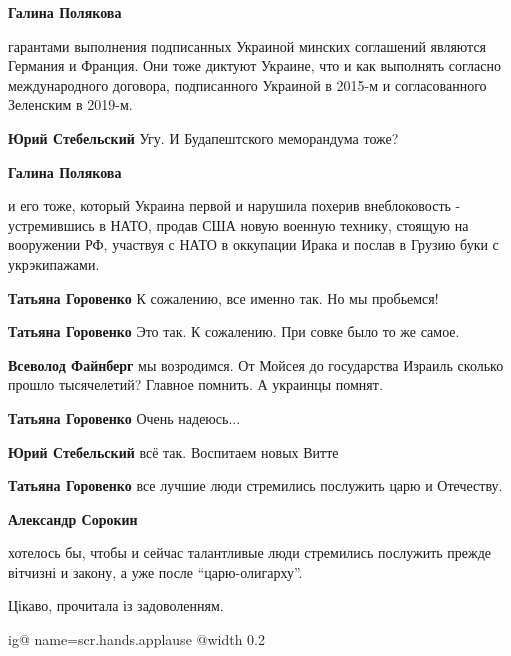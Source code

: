 \begin{itemize}
\begin{itemize}
\begin{itemize}
\textbf{Галина Полякова} 

гарантами выполнения подписанных Украиной минских соглашений являются Германия
и Франция. Они тоже диктуют Украине, что и как выполнять согласно
международного договора, подписанного Украиной в 2015-м и согласованного
Зеленским в 2019-м.

\textbf{Юрий Стебельский} Угу. И Будапештского меморандума тоже?

\textbf{Галина Полякова} 

и его тоже, который Украина первой и нарушила похерив внеблоковость -
устремившись в НАТО, продав США новую военную технику, стоящую на вооружении
РФ, участвуя с НАТО в оккупации Ирака и послав в Грузию буки с укрэкипажами.

\end{itemize} %

\textbf{Татьяна Горовенко} К сожалению, все именно так. Но мы пробьемся!

\textbf{Татьяна Горовенко} Это так. К сожалению. При совке было то же самое.

\begin{itemize} %
\textbf{Всеволод Файнберг} мы возродимся. От Мойсея до государства Израиль сколько прошло тысячелетий? Главное помнить. А украинцы помнят.

\textbf{Татьяна Горовенко} Очень надеюсь...
\end{itemize} %

\textbf{Юрий Стебельский} всё так. Воспитаем новых Витте

\textbf{Татьяна Горовенко} все лучшие люди стремились послужить царю и Отечеству.

\begin{itemize} %
\textbf{Александр Сорокин} 

хотелось бы, чтобы и сейчас талантливые люди стремились послужить прежде
вітчизні и закону, а уже после \enquote{царю-олигарху}.

\end{itemize} %

\end{itemize} %

Цікаво, прочитала із задоволенням.

\ifcmt
  ig@ name=scr.hands.applause
  @width 0.2
\fi


\end{itemize}
